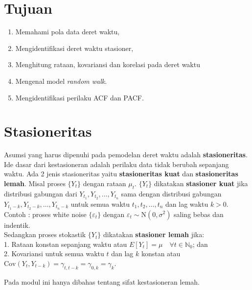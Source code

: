 \documentclass[
]{book}
\providecommand{\tightlist}{%
  \setlength{\itemsep}{0pt}\setlength{\parskip}{0pt}}
\begin{document}
\hypertarget{tujuan}{%
\section{Tujuan}\label{tujuan}}

\begin{enumerate}
\def\labelenumi{\arabic{enumi}.}
\tightlist
\item
  Memahami pola data deret waktu,\\
\item
  Mengidentifikasi deret waktu stasioner,\\
\item
  Menghitung rataan, kovariansi dan korelasi pada deret waktu\\
\item
  Mengenal model \emph{random walk}.\\
\item
  Mengidentifikasi perilaku ACF dan PACF.
\end{enumerate}

\hypertarget{stasioneritas}{%
\section{Stasioneritas}\label{stasioneritas}}

Asumsi yang harus dipenuhi pada pemodelan deret waktu adalah \textbf{stasioneritas}. Ide dasar dari kestasioneran adalah perilaku data tidak berubah sepanjang waktu. Ada 2 jenis stasioneritas yaitu \textbf{stasioneritas kuat} dan \textbf{stasioneritas lemah}. Misal proses \(\{Y_t\}\) dengan rataan \(\mu_t\). \(\{Y_t\}\) dikatakan \textbf{stasioner kuat} jika distribusi gabungan dari \(Y_{t_1},Y_{t_2},\dots,Y_{t_n}\) sama dengan distribusi gabungan \(Y_{t_1-k},Y_{t_2-k},\dots,Y_{t_n-k}\) untuk semua waktu \(t_1,t_2,\dots,t_n\) dan lag waktu \(k>0\).\\
Contoh : proses white noise \(\{\varepsilon_t\}\) dengan \(\varepsilon_t \sim \text{N}(0, \sigma^2)\) saling bebas dan indentik.\\
Sedangkan proses stokastik \(\{Y_t \}\) dikatakan \textbf{stasioner lemah} jika:\\
1. Rataan konstan sepanjang waktu atau \(E[Y_t] = \mu \quad \forall t \in \mathbb{N}_0\); dan\\
2. Kovariansi untuk semua waktu \(t\) dan lag \(k\) konstan atau \(\text{Cov}(Y_t,Y_{t-k}) = \gamma_{t,t-k} = \gamma_{0,k} = \gamma_k\).

Pada modul ini hanya dibahas tentang sifat kestasioneran lemah.
\end{document}
